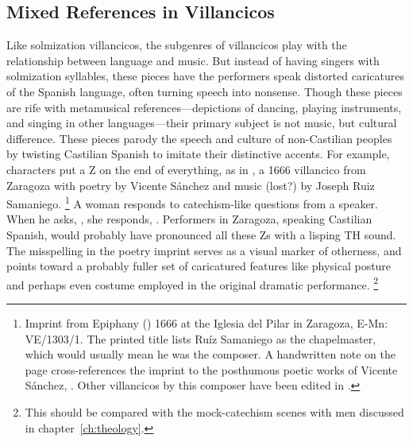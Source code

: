 
\subsection{%
Mixed References in  Villancicos
}

Like solmization villancicos, the subgenres of  villancicos play with the relationship between language and music. 
But instead of having singers  with solmization syllables, these pieces have the performers speak distorted caricatures of the Spanish language, often turning speech into nonsense.
Though these pieces are rife with metamusical references---depictions of dancing, playing instruments, and singing in other languages---their primary subject is not music, but cultural difference.
These pieces parody the speech and culture of non-Castilian peoples by twisting Castilian Spanish to imitate their distinctive accents. 
For example,   characters put a Z on the end of everything, as in , a 1666 villancico from Zaragoza with poetry by Vicente Sánchez and music (lost?) by Joseph Ruiz Samaniego.%
	\footnote{%
	Imprint from Epiphany () 1666 at the Iglesia del Pilar in Zaragoza, E-Mn: VE/1303/1.
	The printed title lists Ruíz Samaniego as the chapelmaster, which would usually mean he was the composer. 
	A handwritten note on the page cross-references the imprint to the posthumous poetic works of Vicente Sánchez, .
	Other villancicos by this composer have been edited in \autocite{RuizSamaniego:MME63}.
	}
A  woman responds to catechism-like questions from a  speaker.
When he asks, , she responds, .
Performers in Zaragoza, speaking Castilian Spanish, would probably have pronounced all these Zs with a lisping TH sound.
The misspelling in the poetry imprint serves as a visual marker of otherness, and points toward a probably fuller set of caricatured features like physical posture and perhaps even costume employed in the original dramatic performance.%
	\footnote{%
	This should be compared with the mock-catechism scenes with  men discussed in chapter~\ref{ch:theology}.
	}

